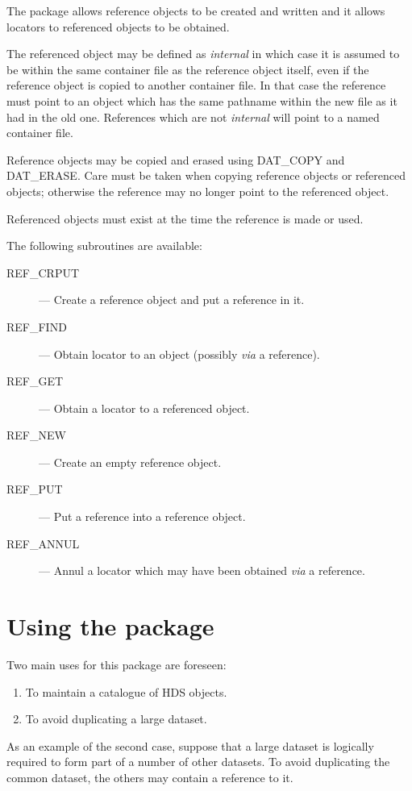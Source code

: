 \documentclass[twoside,11pt]{article}
\newcommand{\xlabel}[1]{}
\begin{document}
The package allows reference objects to be created and written and it
allows locators to referenced objects to be obtained.

The referenced object may be defined as \emph{internal\/} in which case
it is assumed to be within the same container file as the reference
object itself, even if the reference object is copied to another
container file.  In that case the reference must point to an object
which has the same pathname within the new file as it had in the old
one.  References which are not \emph{internal\/} will point to a named
container file.

Reference objects may be copied and erased using DAT\_COPY and
DAT\_ERASE\@.  Care must be taken when copying reference objects or
referenced objects; otherwise the reference may no longer point to the
referenced object.

Referenced objects must exist at the time the reference is made or used.

The following subroutines are available:
\begin{description}
\item [REF\_CRPUT] --- Create a reference object and put a reference in it.
\item [REF\_FIND] --- Obtain locator to an object (possibly \emph{via} a
reference).
\item [REF\_GET] --- Obtain a locator to a referenced object.
\item [REF\_NEW] --- Create an empty reference object.
\item [REF\_PUT] --- Put a reference into a reference object.
\item [REF\_ANNUL] --- Annul a locator which may have been obtained 
\emph{via} a reference.
\end{description}

\section{\xlabel{using_the_package}Using the package}
\label{using_the_package}

Two main uses for this package are foreseen:

\begin{enumerate}
\item To maintain a catalogue of HDS objects.
\item To avoid duplicating a large dataset.
\end{enumerate}

As an example of the second case, suppose that a large dataset is
logically required to form part of a number of other datasets.  To
avoid duplicating the common dataset, the others may contain a
reference to it.
\end{document}
